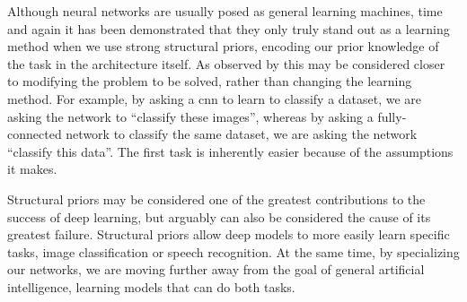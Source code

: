 \documentclass[thesis]{subfiles}
\begin{document}
	Although neural networks are usually posed as general learning machines, time and again it has been demonstrated that they only truly stand out as a learning method when we use strong structural priors, encoding our prior knowledge of the task in the architecture itself. As observed by \citet{denker1987large} this may be considered closer to modifying the problem to be solved, rather than changing the learning method. For example, by asking a \gls{cnn} to learn to classify a dataset, we are asking the network to ``classify these images'', whereas by asking a fully-connected network to classify the same dataset, we are asking the network ``classify this data''. The first task is inherently easier because of the assumptions it makes.

    Structural priors may be considered one of the greatest contributions to the success of deep learning, but arguably can also be considered the cause of its greatest failure. Structural priors allow deep models to more easily learn specific tasks, \ie image classification or speech recognition. At the same time, by specializing our networks, we are moving further away from the goal of general artificial intelligence, \ie learning models that can do both tasks.
    



\end{document}
